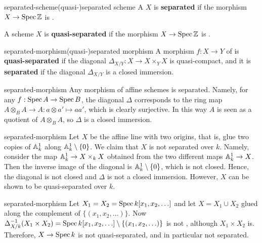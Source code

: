 \begin{topic}{separated-scheme}{(quasi-)separated scheme}
    A  $X$ is \textbf{separated} if the morphism $X \to \Spec \ZZ$ is .
    
    A scheme $X$ is \textbf{quasi-separated} if the morphism $X \to \Spec \ZZ$ is .
\end{topic}

\begin{topic}{separated-morphism}{(quasi-)separated morphism}
    A morphism $f : X \to Y$ of  is \textbf{quasi-separated} if the diagonal $\Delta_{X/Y} : X \to X \times_Y X$ is quasi-compact, and it is \textbf{separated} if the diagonal $\Delta_{X/Y}$ is a closed immersion.
\end{topic}

\begin{example}{separated-morphism}
    Any morphism of affine schemes is separated. Namely, for any $f : \Spec A \to \Spec B$, the diagonal $\Delta$ corresponds to the ring map $A \otimes_B A \to A : a \otimes a' \mapsto aa'$, which is clearly surjective. In this way $A$ is seen as a quotient of $A \otimes_B A$, so $\Delta$ is a closed immersion.
\end{example}

\begin{example}{separated-morphism}
    Let $X$ be the affine line with two origins, that is, glue two copies of $\AA_k^1$ along $\AA_k^1 \setminus \{ 0 \}$. We claim that $X$ is not separated over $k$. Namely, consider the map $\AA^1_k \to X \times_k X$ obtained from the two different maps $\AA_k^1 \to X$. Then the inverse image of the diagonal is $\AA_k^1 \setminus \{ 0 \}$, which is not closed. Hence, the diagonal is not closed and $\Delta$ is not a closed immersion. However, $X$ can be shown to be quasi-separated over $k$.
\end{example}

\begin{example}{separated-morphism}
    Let $X_1 = X_2 = \Spec k[x_1, x_2, \ldots]$ and let $X = X_1 \cup X_2$ glued along the complement of $\{ (x_1, x_2, \ldots) \}$. Now $\Delta_{X/k}^{-1}(X_1 \times X_2) = \Spec k[x_1, x_2, \ldots] \setminus \{ (x_1, x_2, \ldots) \}$ is not , although $X_1 \times X_2$ is. Therefore, $X \to \Spec k$ is not quasi-separated, and in particular not separated.
\end{example}

